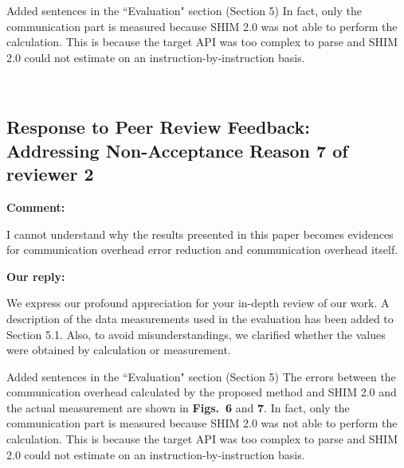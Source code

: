 \documentclass{article}
\begin{document}
\begin{itembox}[|]{Added sentences in the ``Evaluation" section (Section 5)}
    In fact, only the communication part is measured because SHIM 2.0 was not able to perform the calculation. This is because the target API was too complex to parse and SHIM 2.0 could not estimate on an instruction-by-instruction basis.
\end{itembox}\\

\newpage
\subsection{Response to Peer Review Feedback: Addressing Non-Acceptance Reason 7 of reviewer 2}
\begin{flushleft}
  \textbf{Comment:}
\end{flushleft}
\begin{adjustwidth}{1cm}{1cm}  %
   I cannot understand why the results presented in this paper becomes evidences for communication overhead error reduction and communication overhead itself. 
\end{adjustwidth}
    
\begin{flushleft}
  \textbf{Our reply:}
\end{flushleft}
\begin{adjustwidth}{1cm}{1cm}  %
    We express our profound appreciation for your in-depth review of our work. A description of the data measurements used in the evaluation has been added to Section 5.1.
    Also, to avoid misunderstandings, we clarified whether the values were obtained by calculation or measurement.
\end{adjustwidth}
\bigskip
\begin{itembox}[|]{Added sentences in the ``Evaluation" section (Section 5)}
    The errors between the communication overhead calculated by the proposed method and SHIM 2.0 and the actual measurement are shown in \textbf{Figs.~6} and \textbf{7}.
    In fact, only the communication part is measured because SHIM 2.0 was not able to perform the calculation. This is because the target API was too complex to parse and SHIM 2.0 could not estimate on an instruction-by-instruction basis.
\end{itembox}\\
\end{document}
